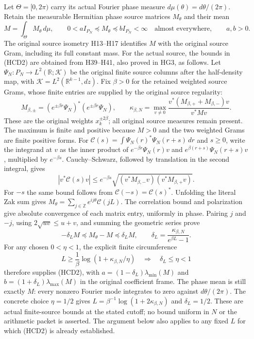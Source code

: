 \documentclass[11pt]{article}
\newcommand{\R}{\mathbb R}
\begin{document}
Let $\Theta=[0,2\pi)$ carry its actual Fourier phase measure
$d\mu(\theta)=d\theta/(2\pi)$. Retain the measurable Hermitian
phase source matrices $M_\theta$ and their mean
\[
 M=\int_\Theta M_\theta\,d\mu,\qquad
 0<a I_{P_N}\preceq M_\theta\preceq b I_{P_N}<\infty
 \quad\text{almost everywhere},\qquad a,b>0.
 \tag{HCD2}
\]
The original source isometry H13--H17 identifies $M$ with the
original source Gram, including its full constant mass.
For the actual source, the bounds in (HCD2) are obtained from
H39--H41, also proved in HG3, as follows. Let
$\Psi_N:P_N\to L^2(\R;\mathcal K)$ be the original finite
source columns after the half-density map, with
$\mathcal K=L^2(\R^{k-1},dz)$. Fix $\beta>0$ for the retained
weighted source Grams, whose finite entries are supplied by
the original source regularity:
\[
 M_{\beta,\pm}=(e^{\pm\beta r}\Psi_N)^*
                    (e^{\pm\beta r}\Psi_N),\qquad
 \kappa_{\beta,N}=
 \max_{v\ne0}\frac{v^*(M_{\beta,+}+M_{\beta,-})v}{v^*Mv}.
 \tag{HCD2a}
\]
These are the original weights $x_k^{\pm2\beta}$; all original
source measures remain present. The maximum is finite and positive
because $M>0$ and the two weighted Grams are finite positive forms.
For $\mathcal C(s)=\int\Psi_N(r)^*\Psi_N(r+s)\,dr$ and $s\ge0$,
write the integrand at $v$ as the inner product of
$e^{-\beta r}\Psi_N(r)v$ and
$e^{\beta(r+s)}\Psi_N(r+s)v$, multiplied by $e^{-\beta s}$.
Cauchy--Schwarz, followed by translation in the second integral,
gives
\[
 |v^*\mathcal C(s)v|
 \le e^{-\beta s}
 \sqrt{(v^*M_{\beta,-}v)(v^*M_{\beta,+}v)} .
\]
For $-s$ the same bound follows from
$\mathcal C(-s)=\mathcal C(s)^*$.
Unfolding the literal Zak sum gives
$M_\theta=\sum_{j\in\mathbb Z}e^{ij\theta}\mathcal C(jL)$.
The correlation bound and polarization give absolute convergence
of each matrix entry, uniformly in phase. Pairing $j$ and $-j$,
using $2\sqrt{uv}\le u+v$, and summing the geometric series prove
\[
 -\delta_LM\preceq M_\theta-M\preceq\delta_LM,\qquad
 \delta_L=\frac{\kappa_{\beta,N}}{e^{\beta L}-1}.
 \tag{HCD2b}
\]
For any chosen $0<\eta<1$, the explicit finite circumference
\[
 L\ge\frac1\beta\log(1+\kappa_{\beta,N}/\eta)
 \quad\Longrightarrow\quad
 \delta_L\le\eta<1
 \tag{HCD2c}
\]
therefore supplies (HCD2), with
$a=(1-\delta_L)\lambda_{\min}(M)$ and
$b=(1+\delta_L)\lambda_{\max}(M)$ in the original coefficient
frame. The phase mean is still exactly $M$: every nonzero
Fourier mode integrates to zero against $d\theta/(2\pi)$.
The concrete choice $\eta=1/2$ gives
$L=\beta^{-1}\log(1+2\kappa_{\beta,N})$ and $\delta_L=1/2$.
These are actual finite-source bounds at the stated cutoff;
no bound uniform in $N$ or the arithmetic packet is asserted.
The argument below also applies to any fixed $L$ for which
(HCD2) is already established.
\end{document}

